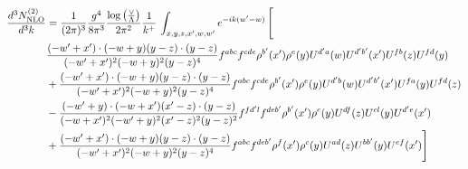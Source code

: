 \documentclass[aps,prd,amsmath,amssymb,nofootinbib]{revtex4-2}
\numberwithin{equation}{section}
\begin{document}
\begin{align}
    \frac{d^{3}N^{(2)}_{\rm NLO}}{d^{3}k} & = \frac{1}{(2\pi)^{3}}\frac{g^{4}}{8\pi^{3}}\frac{\log{\left(\frac{\vee}{\Lambda}\right)}}{2\pi^{2}} \frac{1}{k^{+}}\,\int_{x,y,z,x^{\prime},w,w^{\prime}}e^{-ik(w^{\prime}-w)}\, \Bigg[\notag \\ &  \frac{( - w' + x') \cdot ( - w + y) (y - z) \cdot (y - z)}{( - w' + x')^{2} ( - w + y)^{2} (y - z)^{4}} f^{a b c} f^{c d e} \rho^{b'}(x') \rho^{e}(y) U^{d' a}(w) U^{d' b'}(x') U^{f b}(z) U^{f d}(y)\nonumber\\
        &+ \frac{( - w' + x') \cdot ( - w + y) (y - z) \cdot (y - z)}{( - w' + x')^{2} ( - w + y)^{2} (y - z)^{4}} f^{a b c} f^{c d e} \rho^{b'}(x') \rho^{e}(y) U^{d' b}(w) U^{d' b'}(x') U^{f a}(y) U^{f d}(z)\nonumber\\
    &- \frac{( - w' + y) \cdot ( - w + x') (x' - z) \cdot (y - z)}{( - w + x')^{2} ( - w' + y)^{2} (x' - z)^{2} (y - z)^{2}} f^{f d' l} f^{d e b'} \rho^{b'}(x') \rho^{c}(y) U^{d f}(z) U^{c l}(y) U^{d' e}(x')\nonumber\\
    & + \frac{( - w' + x') \cdot ( - w + y) (y - z) \cdot (y - z)}{( - w' + x')^{2} ( - w + y)^{2} (y - z)^{4}} f^{a b c} f^{d e b'} \rho^{f}(x') \rho^{c}(y) U^{a d}(z) U^{b b'}(y) U^{e f}(x')\Bigg]
\end{align}
\end{document}
